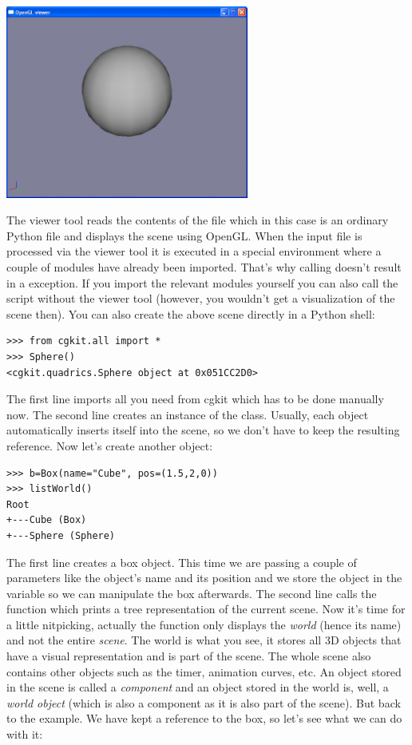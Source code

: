 \begin{center}
\includegraphics[width=8cm]{pics/helloworld}
\end{center}

The viewer tool reads the contents of the file which in this case
is an ordinary Python file and displays the scene using OpenGL.
When the input file is processed via the viewer tool it is executed
in a special environment where a couple of modules have already been imported.
That's why calling  doesn't result in a 
exception. If you import the relevant modules yourself you can also call
the script without the viewer tool (however, you wouldn't get a visualization
of the scene then). You can also create the above scene directly in a 
Python shell:

\begin{verbatim}
>>> from cgkit.all import *
>>> Sphere()
<cgkit.quadrics.Sphere object at 0x051CC2D0>
\end{verbatim}

The first line imports all you need from cgkit which has to be done
manually now. The second line creates an instance of the
 class. Usually, each object automatically inserts
itself into the scene, so we don't have to keep the resulting
reference. Now let's create another object:

\begin{verbatim}
>>> b=Box(name="Cube", pos=(1.5,2,0))
>>> listWorld()
Root
+---Cube (Box)
+---Sphere (Sphere)
\end{verbatim}

The first line creates a box object. This time we are passing a couple
of parameters like the object's name and its position and we store the
object in the variable  so we can manipulate the box afterwards.
The second line calls the  function
which prints a tree representation of the current scene.
Now it's time for a little nitpicking, actually the function only displays
the {\em world} (hence its name) and not the entire {\em scene}. The world
is what you see, it stores all 3D objects that have a visual representation
and is part of the scene. The whole scene also contains other objects
such as the timer, animation curves, etc. An object stored in the
scene is called a {\em component} and an object stored in the world
is, well, a {\em world object} (which is also a component as it is also
part of the scene). But back to the example. We have kept a reference to
the box, so let's see what we can do with it:

